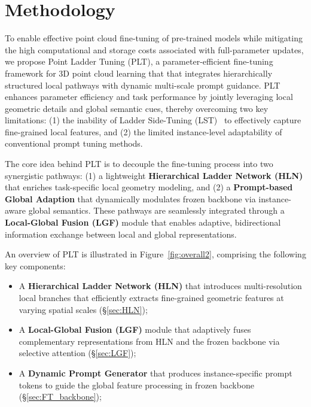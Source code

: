 


\section{Methodology}
\label{sec:methodology}

To enable effective point cloud fine-tuning of pre-trained models while mitigating the high computational and storage costs associated with full-parameter updates, we propose Point Ladder Tuning (PLT), a parameter-efficient fine-tuning framework for 3D point cloud learning that that integrates hierarchically structured local pathways with dynamic multi-scale prompt guidance. PLT enhances parameter efficiency and task performance by jointly leveraging local geometric details and global semantic cues, thereby overcoming two key limitations: (1) the inability of Ladder Side-Tuning (LST)~\cite{sung2022lst} to effectively capture fine-grained local features, and (2) the limited instance-level adaptability of conventional prompt tuning methods.

The core idea behind PLT is to decouple the fine-tuning process into two synergistic pathways: (1) a lightweight \textbf{Hierarchical Ladder Network (HLN)} that enriches task-specific local geometry modeling, and (2) a \textbf{Prompt-based Global Adaption} that dynamically modulates frozen backbone via instance-aware global semantics. These pathways are seamlessly integrated through a \textbf{Local-Global Fusion (LGF)} module that enables adaptive, bidirectional information exchange between local and global representations.

An overview of PLT is illustrated in Figure~\ref{fig:overall2}, comprising the following key components:
\begin{itemize}
    \item A \textbf{Hierarchical Ladder Network (HLN)} that introduces multi-resolution local branches that efficiently extracts fine-grained geometric features at varying spatial scales (\S\ref{sec:HLN});
    \item A \textbf{Local-Global Fusion (LGF)} module that adaptively fuses complementary representations from HLN and the frozen backbone via selective attention (\S\ref{sec:LGF});
    \item A \textbf{Dynamic Prompt Generator} that produces instance-specific prompt tokens to guide the global feature processing in frozen backbone (\S\ref{sec:FT_backbone});
\end{itemize}

